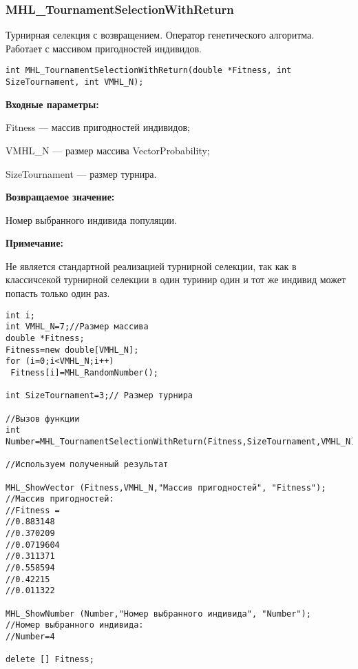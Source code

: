 \documentclass[a4paper,12pt]{article}
\begin{document}
\subsubsection{MHL\_TournamentSelectionWithReturn}\label{MHL_TournamentSelectionWithReturn}

Турнирная селекция с возвращением. Оператор генетического алгоритма. Работает с массивом пригодностей индивидов.


\begin{lstlisting}[label=code_syntax_MHL_TournamentSelectionWithReturn,caption=Синтаксис]
int MHL_TournamentSelectionWithReturn(double *Fitness, int SizeTournament, int VMHL_N);
\end{lstlisting}

\textbf{Входные параметры:}
 
Fitness --- массив пригодностей индивидов;
 
VMHL\_N --- размер массива VectorProbability;
 
SizeTournament --- размер турнира.

\textbf{Возвращаемое значение:} 

 Номер выбранного индивида популяции.

\textbf{Примечание:}

 Не является стандартной реализацией турнирной селекции, так как в классичсекой турнирной селекции в один туринир один и тот же индивид может попасть только один раз.




\begin{lstlisting}[label=code_use_MHL_TournamentSelectionWithReturn,caption=Пример использования]
int i;
int VMHL_N=7;//Размер массива
double *Fitness;
Fitness=new double[VMHL_N];
for (i=0;i<VMHL_N;i++)
 Fitness[i]=MHL_RandomNumber();

int SizeTournament=3;// Размер турнира

//Вызов функции
int Number=MHL_TournamentSelectionWithReturn(Fitness,SizeTournament,VMHL_N);

//Используем полученный результат

MHL_ShowVector (Fitness,VMHL_N,"Массив пригодностей", "Fitness");
//Массив пригодностей:
//Fitness =	
//0.883148
//0.370209
//0.0719604
//0.311371
//0.558594
//0.42215
//0.011322

MHL_ShowNumber (Number,"Номер выбранного индивида", "Number");
//Номер выбранного индивида:
//Number=4

delete [] Fitness;
\end{lstlisting}
\end{document}

